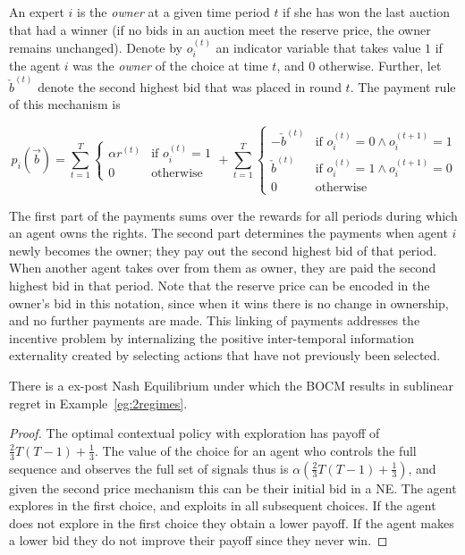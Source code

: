 \begin{mech}
An expert $i$ is the \emph{owner} at a given time period $t$ if she has won the last auction that had a winner (if no bids in an auction meet the reserve price, the owner remains unchanged).
   Denote by $o^{(t)}_{i}$ an indicator variable that takes value $1$ if the agent $i$ was the \emph{owner} of the choice at time $t$, and $0$ otherwise. Further, let $\check b^{(t)}$ denote the second highest bid that was placed in round $t$. The payment rule of this mechanism is

\[
   p_i(\vec b) =  \sum_{t=1}^T
\begin{cases}
    \alpha r^{(t)} & \text{if } o^{(t)}_{i} = 1\\
    0              & \text{otherwise}
\end{cases}
+
   \sum_{t=1}^T
\begin{cases}
     - \check b^{(t)} & \text{if } o^{(t)}_{i} = 0 \land o^{(t+1)}_{i} = 1\\
      \check b^{(t)} & \text{if } o^{(t)}_{i}= 1 \land o^{(t+1)}_{i} = 0 \\
		0              & \text{otherwise}
\end{cases}
\]

\end{mech}


The first part of the payments sums over the rewards for all periods during which an agent owns the rights.
The second part determines the payments when agent $i$ newly becomes the owner; they pay out the second highest bid of that period. 
When another agent takes over from them as owner, they are paid the second highest bid in that period.
Note that the reserve price can be encoded in the owner's bid in this notation, since when it wins there is no change in ownership, and no further payments are made. 
This linking of payments addresses the incentive problem by internalizing the positive inter-temporal information externality created by selecting actions that have not previously been selected.


\begin{prop}
There is a ex-post Nash Equilibrium under which the BOCM results in sublinear regret in Example~\ref{eg:2regimes}. 
\end{prop}

\begin{proof}
The optimal contextual policy with exploration has payoff of $\frac{2}{3}T(T-1) + \frac{1}{3}$. The value of the choice for an agent who controls the full sequence and observes the full set of signals thus is $\alpha (\frac{2}{3}T(T-1) + \frac{1}{3})$, and given the second price mechanism this can be their initial bid in a NE.
The agent explores in the first choice, and exploits in all subsequent choices. If the agent does not explore in the first choice they obtain a lower payoff. If the agent makes a lower bid they do not improve their payoff since they never win.
\end{proof}


